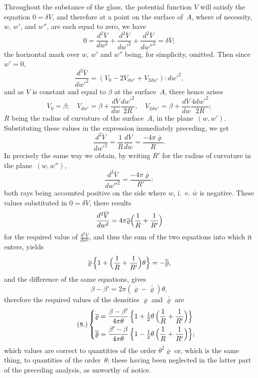 \documentclass[12pt,notitlepage]{amsart}
\renewcommand{\rho}{\varrho}
\begin{document}
Throughout the substance of the glass, the potential function $V$ will
satisfy the equation ${0=\delta V}$,
and therefore at a point on the surface of~$A$,
where of necessity, $w$, $w'$, and $w''$,
are each equal to zero, we have
\[
0=\frac{d^2\overline{V}}{dw^2}
+\frac{d^2\overline{V}}{dw'^2}
+\frac{d^2\overline{V}}{dw''^2}
=\delta\overline{V};
\]
the horizontal mark over $w$, $w'$ and $w''$ being,
for simplicity, omitted. Then
since~$w'=0$,
\[
\frac{d^2\overline{V}}{dw'^2}
=(V_0-2V_{dw'}+V_{2dw'}):dw'^2,
\]
and as $V$ is constant and equal to $\beta$
at the surface~$A$, there hence arises
\[
V_0=\beta;\quad
V_{dw'}=\beta+\frac{d\overline{V}}{dw}\frac{dw'^2}{2R},\quad
V_{2dw'}=\beta+\frac{d\overline{V}}{dw}\frac{4dw'^2}{2R};
\]
$R$ being the radius of curvature of the surface~$A$,
in the plane~$(w, w')$. Substituting
these values in the expression immediately preceding, we get
\[
\frac{d^2\overline{V}}{dw'^2}
=\frac1R\frac{d\overline{V}}{dw}
=\frac{-4\pi\overline\rho}{R}.
\]
In precisely the same way we obtain, by writing $R'$ for the radius of 
curvature in the plane~$(w, w'')$,
\[
\frac{d^2\overline{V}}{dw''^2}
=\frac{-4\pi\overline\rho}{R'}:
\]
both rays being accounted positive on the side where $w$,
i.~e. $\overline{w}$ is negative.
These values substituted in $0=\delta V$, there results
\[
\frac{d^2\overline{V}}{dw^2}
=4\pi\overline\rho\Bigl(\frac1R+\frac{1}{R'}\Bigr)
\]
for the required value of $\frac{d^2V}{dw^2}$,
and thus the sum of the two equations into
which it enters, yields
\[
\overline\rho\,\Bigl\{1+\Bigl(\frac1R+\frac{1}{R'}\Bigr)\theta\Bigr\}
=-\overline{\overline\rho},
\]
and the difference of the same equations, gives
\[
\beta-\beta'=2\pi(\overline\rho-\overline{\overline\rho})\theta,
\]
therefore the required values of the densities
$\overline\rho$ and $\overline{\overline\rho}$ are
\[
\tag{8.}
\left\{
  \begin{aligned}
  \overline\rho &=
  \frac{\beta-\beta'}{4\pi\theta}
  \,\Bigl\{1+\tfrac12\theta\,\Bigl(\frac1R+\frac{1}{R'}\Bigr)\Bigr\}\\
  \overline{\overline\rho} &=
  \frac{\beta'-\beta}{4\pi\theta}
  \,\Bigl\{1-\tfrac12\theta\,\Bigl(\frac1R+\frac{1}{R'}\Bigr)\Bigr\};
  \end{aligned}
\right.
\]
which values are correct to quantities
of the order $\theta^2\overline\rho$ or, which is the same
thing, to quantities of the order~$\theta$;
these having been neglected in the latter
part of the preceding analysis, as unworthy of notice.
\end{document}
